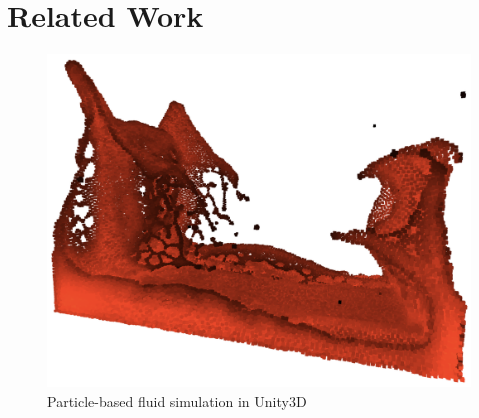 \chapter{Related Work}\label{chapter:relatedwork}
\begin{figure}[t]
    \centering
	\includegraphics[scale=0.35]{figures/unity-sph2}

	\caption{Particle-based fluid simulation in Unity3D \parencite{unity3d} \parencite{mysph}}
\end{figure}


